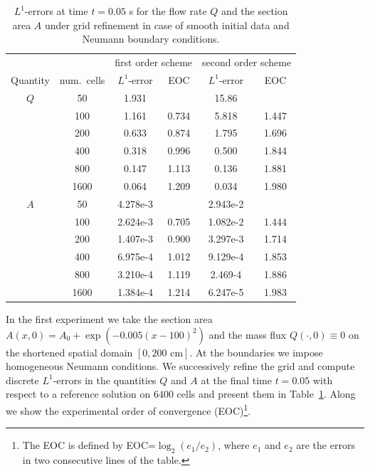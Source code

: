 \documentclass[a4paper,11pt]{article}
\begin{document}
\begin{table}
    \caption{$L^1$-errors at time $t=0.05$ s for the flow rate $Q$ and the section area $A$ under grid refinement in case of smooth initial data and Neumann boundary conditions.}\label{tab:NerrorsGauss}\vspace{1em}
  \centering
    \footnotesize
    \begin{tabular}{cc|cc|cc}
        &&\multicolumn{2}{c|}{first order scheme} & \multicolumn{2}{c}{second order scheme} \\
        Quantity & num.\ cells & $L^1$-error & EOC & $L^1$-error & EOC   \\
        \hline
           $Q$ & 50 & 1.931 &  & 15.86 & \\
            & 100 & 1.161 & 0.734 & 5.818 &  1.447\\
            & 200 & 0.633 & 0.874 & 1.795 & 1.696 \\
            & 400 & 0.318 & 0.996 & 0.500 & 1.844\\
            & 800 & 0.147 & 1.113 & 0.136 & 1.881\\
            & 1600 & 0.064 & 1.209 & 0.034 & 1.980\\
            \hline
          $A$  & 50 & 4.278e-3 &  & 2.943e-2 & \\ 
            & 100 & 2.624e-3 & 0.705 & 1.082e-2 & 1.444\\
            & 200 & 1.407e-3 & 0.900 & 3.297e-3 & 1.714\\
            & 400 & 6.975e-4 & 1.012 & 9.129e-4 & 1.853\\
            & 800 & 3.210e-4 & 1.119 & 2.469-4 & 1.886\\
            & 1600 & 1.384e-4 & 1.214 & 6.247e-5 & 1.983\\
    \end{tabular}
\end{table}

In the first experiment we take the section area $A(x, 0) = A_0 + \exp(-0.005(x-100)^2)$ and the mass flux $Q(\cdot, 0) \equiv 0$ on the shortened spatial domain $[0,200\text{ cm}]$. At the boundaries we impose homogeneous Neumann conditions. We successively refine the grid and compute discrete $L^1$-errors in the quantities $Q$ and $A$ at the final time $t=0.05$ with respect to a reference solution on $6400$ cells and present them in Table~\ref{tab:NerrorsGauss}. Along we show the experimental order of convergence (EOC)\footnote{The EOC is defined by EOC=$\log_2(e_1/e_2)$, where $e_1$ and $e_2$ are the errors in two consecutive lines of the table.}.
\end{document}

